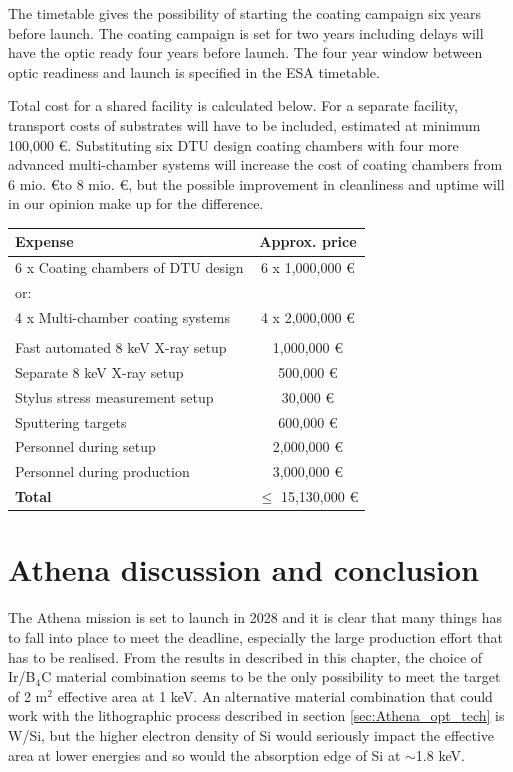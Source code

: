 The timetable gives the possibility of starting the coating campaign six years before launch. The coating campaign is set for two years including delays will have the optic ready four years before launch. The four year window between optic readiness and launch is specified in the ESA timetable.

Total cost for a shared facility is calculated below. For a separate facility, transport costs of substrates will have to be included, estimated at minimum 100,000 \euro. Substituting six DTU design coating chambers with four more advanced multi-chamber systems will increase the cost of coating chambers from 6 mio. \euro to 8 mio. \euro, but the possible improvement in cleanliness and uptime will in our opinion make up for the difference.

\begin{table}[htbp]
	\centering
\begin{tabular}{l|c}
Expense & Approx. price\\
\hline
\hline
6 x Coating chambers of DTU design  & 6 x 1,000,000 \euro\\
\hline
or:\\
\hline
4 x Multi-chamber coating systems & 4 x 2,000,000 \euro \\
\hline
\\
\hline
Fast automated 8 keV X-ray setup  & 1,000,000 \euro\\
\hline
Separate 8 keV X-ray setup & 500,000 \euro\\
\hline
Stylus stress measurement setup & 30,000 \euro\\
\hline
Sputtering targets & 600,000 \euro\\
\hline
Personnel during setup & 2,000,000 \euro\\
\hline
Personnel during production & 3,000,000 \euro\\
\hline
\textbf{Total} & $\leq$ 15,130,000 \euro\\
\end{tabular}
\end{table}

\section{Athena discussion and conclusion}
The Athena mission is set to launch in 2028 and it is clear that many things has to fall into place to meet the deadline, especially the large production effort that has to be realised. From the results in described in this chapter, the choice of Ir/B$_4$C material combination seems to be the only possibility to meet the target of 2 m$^2$ effective area at 1 keV. An alternative material combination that could work with the lithographic process described in section \ref{sec:Athena_opt_tech} is W/Si, but the higher electron density of Si would seriously impact the effective area at lower energies and so would the absorption edge of Si at $\sim$1.8 keV.

